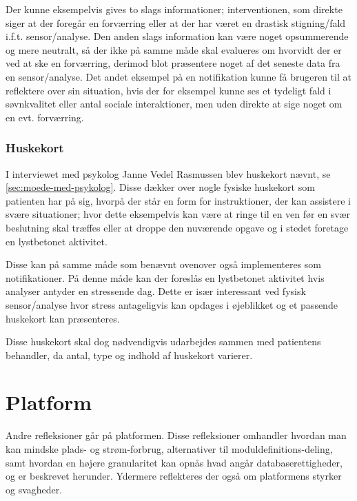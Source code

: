 Der kunne eksempelvis gives to slags informationer; interventionen, som direkte siger at der foregår en forværring eller at der har været en drastisk stigning/fald i.f.t. sensor/analyse.
Den anden slags information kan være noget opsummerende og mere neutralt, så der ikke på samme måde skal evalueres om hvorvidt der er ved at ske en forværring, derimod blot præsentere noget af det seneste data fra en sensor/analyse.
Det andet eksempel på en notifikation kunne få brugeren til at reflektere over sin situation, hvis der for eksempel kunne ses et tydeligt fald i søvnkvalitet eller antal sociale interaktioner, men uden direkte at sige noget om en evt. forværring.

\subsubsection{Huskekort}
I interviewet med psykolog Janne Vedel Rasmussen blev huskekort nævnt, se \cref{sec:moede-med-psykolog}.
Disse dækker over nogle fysiske huskekort som patienten har på sig, hvorpå der står en form for instruktioner, der kan assistere i svære situationer; hvor dette eksempelvis kan være at ringe til en ven før en svær beslutning skal træffes eller at droppe den nuværende opgave og i stedet foretage en lystbetonet aktivitet.

Disse kan på samme måde som benævnt ovenover også implementeres som notifikationer.
På denne måde kan der foreslås en lystbetonet aktivitet hvis analyser antyder en stressende dag.
Dette er især interessant ved fysisk sensor/analyse hvor stress antageligvis kan opdages i øjeblikket og et passende huskekort kan præsenteres.

Disse huskekort skal dog nødvendigvis udarbejdes sammen med patientens behandler, da antal, type og indhold af huskekort varierer.

\section{Platform}
Andre refleksioner går på platformen.
Disse refleksioner omhandler hvordan man kan mindske plads- og strøm-forbrug, alternativer til moduldefinitions-deling, samt hvordan en højere granularitet kan opnås hvad angår databaserettigheder, og er beskrevet herunder.
Ydermere reflekteres der også om platformens styrker og svagheder.

